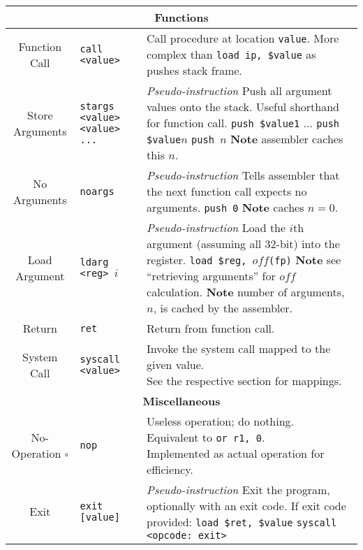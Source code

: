 \documentclass{article}
\begin{document}
\begin{longtable}{|c|l|l|}
    \multicolumn{3}{|c|}{\textbf{Functions}} \\
    \hline
    Function Call & \texttt{call <value>} & \makecell[l]{Call procedure at location \texttt{value}.\\%
    More complex than \texttt{load ip, \$value} as pushes stack frame.} \\
    \hline
    Store Arguments & \texttt{stargs <value> <value> ...} & \makecell[l]{\textit{Pseudo-instruction}\\%
    Push all argument values onto the stack.\\%
    Useful shorthand for function call.\\%
    \texttt{push \$value1}\\%
    ...\\%
    \texttt{push \$value\(n\)}\\%
    \texttt{push \(n\)}\\%
    \textbf{Note} assembler caches this \(n\).} \\
    \hline
    No Arguments & \texttt{noargs} & \makecell[l]{\textit{Pseudo-instruction}\\%
    Tells assembler that the next function call expects no arguments.\\%
    \texttt{push 0}\\%
    \textbf{Note} caches \(n = 0\).} \\
    \hline
    Load Argument & \texttt{ldarg <reg> \(i\)} & \makecell[l]{\textit{Pseudo-instruction}\\%
    Load the \(i\)th argument (assuming all 32-bit) into the register.\\%
    \texttt{load \$reg, \(off\)(fp)}\\%
    \textbf{Note} see ``retrieving arguments'' for \(off\) calculation.\\%
    \textbf{Note} number of arguments, \(n\), is cached by the assembler.} \\
    \hline
    Return & \texttt{ret} & Return from function call. \\
    \hline
    System Call & \texttt{syscall <value>} & \makecell[l]{Invoke the system call mapped to the given value.\\%
    See the respective section for mappings.} \\
    \hline \hline
    \multicolumn{3}{|c|}{\textbf{Miscellaneous}} \\
    \hline
    No-Operation \(\square\) & \texttt{nop} & \makecell[l]{Useless operation; do nothing.\\%
    Equivalent to \texttt{or r1, 0}.\\%
    Implemented as actual operation for efficiency.} \\
    \hline
    Exit & \texttt{exit [value]} & \makecell[l]{\textit{Pseudo-instruction}\\%
    Exit the program, optionally with an exit code.\\%
    If exit code provided: \texttt{load \$ret, \$value}\\%
    \texttt{syscall <opcode: exit>}} \\
    \hline
\end{longtable}
\end{document}
